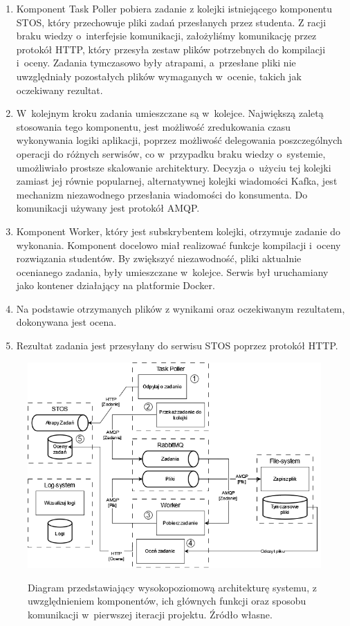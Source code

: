 \begin{enumerate}
	\item Komponent Task Poller pobiera zadanie z kolejki istniejącego komponentu STOS, który przechowuje pliki zadań przesłanych przez studenta. Z racji braku wiedzy o~interfejsie komunikacji, założyliśmy komunikację przez protokół HTTP, który przesyła zestaw plików potrzebnych do kompilacji i~oceny. Zadania tymczasowo były atrapami, a~przesłane pliki nie uwzględniały pozostałych plików wymaganych w~ocenie, takich jak oczekiwany rezultat.
	\item W~kolejnym kroku zadania umieszczane są w~kolejce. Największą zaletą stosowania tego komponentu, jest możliwość zredukowania czasu wykonywania logiki aplikacji, poprzez możliwość delegowania poszczególnych operacji do różnych serwisów, co w~przypadku braku wiedzy o~systemie, umożliwiało prostsze skalowanie architektury. Decyzja o~użyciu tej kolejki zamiast jej równie popularnej, alternatywnej kolejki wiadomości Kafka, jest mechanizm niezawodnego przesłania wiadomości do konsumenta. Do komunikacji używany jest protokół AMQP.
	\item Komponent Worker, który jest subskrybentem kolejki, otrzymuje zadanie do wykonania. Komponent docelowo miał realizować funkcje kompilacji i~oceny rozwiązania studentów. By zwiększyć niezawodność, pliki aktualnie ocenianego zadania, były umieszczane w~kolejce. Serwis był uruchamiany jako kontener działający na platformie Docker.
	\item Na podstawie otrzymanych plików z wynikami oraz oczekiwanym rezultatem, dokonywana jest ocena.
	\item Rezultat zadania jest przesyłany do serwisu STOS poprzez protokół HTTP.
\end{enumerate}
\begin{figure}[!h]
	\begin{center}
		\resizebox{1.0\textwidth}{!} {
			\includegraphics{img/1/i1_arch.png}
		}
		\caption[Architektura po pierwszej iteracji]{Diagram przedstawiający wysokopoziomową architekturę systemu, z uwzględnieniem komponentów, ich głównych funkcji oraz sposobu komunikacji w~pierwszej iteracji projektu. Źródło własne.}
		\label{i1}
	\end{center}
\end{figure}
